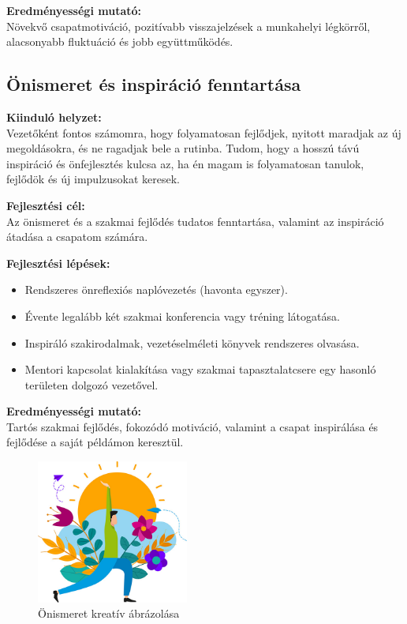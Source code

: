 \textbf{Eredményességi mutató:} \\
Növekvő csapatmotiváció, pozitívabb visszajelzések a munkahelyi légkörről, alacsonyabb fluktuáció és jobb együttműködés.

\subsection{Önismeret és inspiráció fenntartása}

\textbf{Kiinduló helyzet:} \\
Vezetőként fontos számomra, hogy folyamatosan fejlődjek, nyitott maradjak az új megoldásokra, és ne ragadjak bele a rutinba.
Tudom, hogy a hosszú távú inspiráció és önfejlesztés kulcsa az, ha én magam is folyamatosan tanulok, fejlődök és új impulzusokat keresek.

\textbf{Fejlesztési cél:} \\
Az önismeret és a szakmai fejlődés tudatos fenntartása, valamint az inspiráció átadása a csapatom számára.

\textbf{Fejlesztési lépések:}
\begin{itemize}
    \item Rendszeres önreflexiós naplóvezetés (havonta egyszer).
    \item Évente legalább két szakmai konferencia vagy tréning látogatása.
    \item Inspiráló szakirodalmak, vezetéselméleti könyvek rendszeres olvasása.
    \item Mentori kapcsolat kialakítása vagy szakmai tapasztalatcsere egy hasonló területen dolgozó vezetővel.
\end{itemize}

\textbf{Eredményességi mutató:} \\
Tartós szakmai fejlődés, fokozódó motiváció, valamint a csapat inspirálása és fejlődése a saját példámon keresztül.
\begin{figure}[H]
	\centering
    \includegraphics[width=50mm, keepaspectratio]{figures/self_knowledge.jpg}
    \caption{Önismeret kreatív ábrázolása}
    \label {fig:self_knowledge}
\end{figure}
